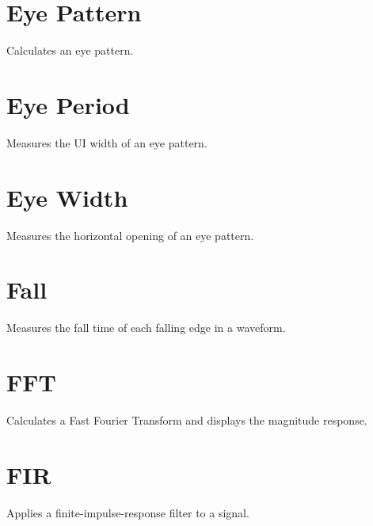 \section{Eye Pattern}

Calculates an eye pattern.

\pagebreak
\section{Eye Period}

Measures the UI width of an eye pattern.

\pagebreak
\section{Eye Width}

Measures the horizontal opening of an eye pattern.

\pagebreak
\section{Fall}

Measures the fall time of each falling edge in a waveform.

\pagebreak
\section{FFT}

Calculates a Fast Fourier Transform and displays the magnitude response.

\pagebreak
\section{FIR}

Applies a finite-impulse-response filter to a signal.

\pagebreak
